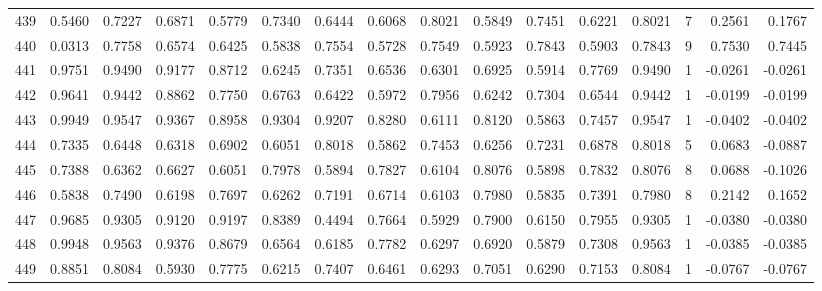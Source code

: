\begin{tabular}{lrrrrrrrrrrrrrrr}
439 &      0.5460 &  0.7227 &  0.6871 &  0.5779 &  0.7340 &  0.6444 &  0.6068 &  0.8021 &  0.5849 &  0.7451 &   0.6221 &     0.8021 &      7 &                    0.2561 &                     0.1767 \\
440 &      0.0313 &  0.7758 &  0.6574 &  0.6425 &  0.5838 &  0.7554 &  0.5728 &  0.7549 &  0.5923 &  0.7843 &   0.5903 &     0.7843 &      9 &                    0.7530 &                     0.7445 \\
441 &      0.9751 &  0.9490 &  0.9177 &  0.8712 &  0.6245 &  0.7351 &  0.6536 &  0.6301 &  0.6925 &  0.5914 &   0.7769 &     0.9490 &      1 &                   -0.0261 &                    -0.0261 \\
442 &      0.9641 &  0.9442 &  0.8862 &  0.7750 &  0.6763 &  0.6422 &  0.5972 &  0.7956 &  0.6242 &  0.7304 &   0.6544 &     0.9442 &      1 &                   -0.0199 &                    -0.0199 \\
443 &      0.9949 &  0.9547 &  0.9367 &  0.8958 &  0.9304 &  0.9207 &  0.8280 &  0.6111 &  0.8120 &  0.5863 &   0.7457 &     0.9547 &      1 &                   -0.0402 &                    -0.0402 \\
444 &      0.7335 &  0.6448 &  0.6318 &  0.6902 &  0.6051 &  0.8018 &  0.5862 &  0.7453 &  0.6256 &  0.7231 &   0.6878 &     0.8018 &      5 &                    0.0683 &                    -0.0887 \\
445 &      0.7388 &  0.6362 &  0.6627 &  0.6051 &  0.7978 &  0.5894 &  0.7827 &  0.6104 &  0.8076 &  0.5898 &   0.7832 &     0.8076 &      8 &                    0.0688 &                    -0.1026 \\
446 &      0.5838 &  0.7490 &  0.6198 &  0.7697 &  0.6262 &  0.7191 &  0.6714 &  0.6103 &  0.7980 &  0.5835 &   0.7391 &     0.7980 &      8 &                    0.2142 &                     0.1652 \\
447 &      0.9685 &  0.9305 &  0.9120 &  0.9197 &  0.8389 &  0.4494 &  0.7664 &  0.5929 &  0.7900 &  0.6150 &   0.7955 &     0.9305 &      1 &                   -0.0380 &                    -0.0380 \\
448 &      0.9948 &  0.9563 &  0.9376 &  0.8679 &  0.6564 &  0.6185 &  0.7782 &  0.6297 &  0.6920 &  0.5879 &   0.7308 &     0.9563 &      1 &                   -0.0385 &                    -0.0385 \\
449 &      0.8851 &  0.8084 &  0.5930 &  0.7775 &  0.6215 &  0.7407 &  0.6461 &  0.6293 &  0.7051 &  0.6290 &   0.7153 &     0.8084 &      1 &                   -0.0767 &                    -0.0767 \\

\end{tabular}
